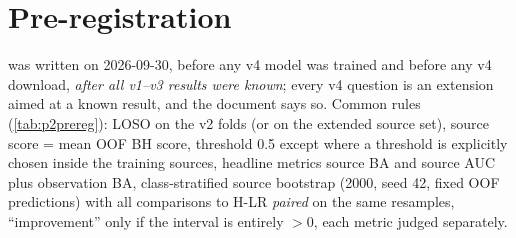 \section{Pre-registration}
 was written on 2026-09-30, before any v4 model was trained and before any v4
download, \emph{after all v1--v3 results were known}; every v4 question is an extension aimed at a known result, and the
document says so. Common rules (\cref{tab:p2prereg}): LOSO on the v2 folds (or on the extended source set), source score
= mean OOF BH score, threshold 0.5 except where a threshold is explicitly chosen inside the training sources, headline
metrics source BA and source AUC plus observation BA, class-stratified source bootstrap (2000, seed 42, fixed OOF
predictions) with all comparisons to H-LR \emph{paired} on the same resamples, ``improvement'' only if the interval is
entirely $>0$, each metric judged separately.

